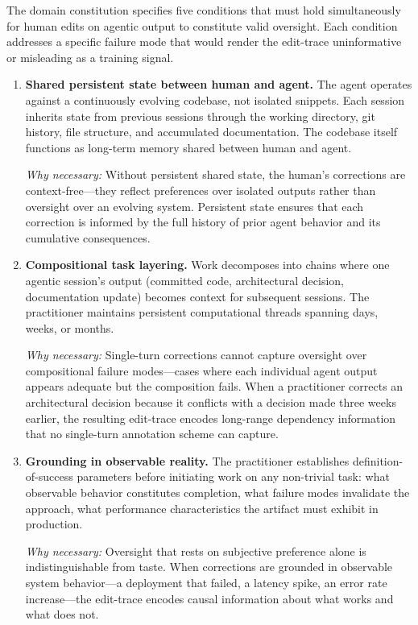 \documentclass[11pt]{article}
\begin{document}
The domain constitution specifies five conditions that must hold simultaneously for human edits on agentic output to constitute valid oversight.
Each condition addresses a specific failure mode that would render the edit-trace uninformative or misleading as a training signal.

\begin{enumerate}[label=\textbf{C\arabic*.},leftmargin=2.5em]

\item \textbf{Shared persistent state between human and agent.}
The agent operates against a continuously evolving codebase, not isolated snippets.
Each session inherits state from previous sessions through the working directory, git history, file structure, and accumulated documentation.
The codebase itself functions as long-term memory shared between human and agent.

\emph{Why necessary:}
Without persistent shared state, the human's corrections are context-free---they reflect preferences over isolated outputs rather than oversight over an evolving system.
Persistent state ensures that each correction is informed by the full history of prior agent behavior and its cumulative consequences.

\item \textbf{Compositional task layering.}
Work decomposes into chains where one agentic session's output (committed code, architectural decision, documentation update) becomes context for subsequent sessions.
The practitioner maintains persistent computational threads spanning days, weeks, or months.

\emph{Why necessary:}
Single-turn corrections cannot capture oversight over compositional failure modes---cases where each individual agent output appears adequate but the composition fails.
When a practitioner corrects an architectural decision because it conflicts with a decision made three weeks earlier, the resulting edit-trace encodes long-range dependency information that no single-turn annotation scheme can capture.

\item \textbf{Grounding in observable reality.}
The practitioner establishes definition-of-success parameters before initiating work on any non-trivial task: what observable behavior constitutes completion, what failure modes invalidate the approach, what performance characteristics the artifact must exhibit in production.

\emph{Why necessary:}
Oversight that rests on subjective preference alone is indistinguishable from taste.
When corrections are grounded in observable system behavior---a deployment that failed, a latency spike, an error rate increase---the edit-trace encodes causal information about what works and what does not.


\end{enumerate}
\end{document}
